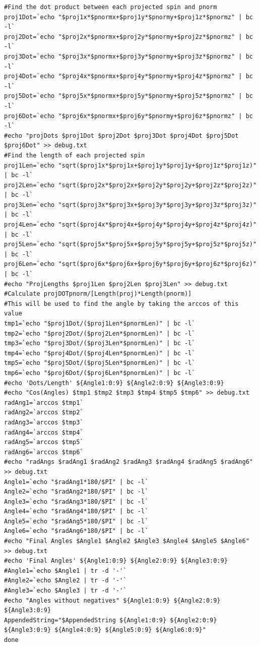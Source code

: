 \documentclass{article}
\begin{document}
\begin{lstlisting}
#Find the dot product between each projected spin and pnorm
proj1Dot=`echo "$proj1x*$pnormx+$proj1y*$pnormy+$proj1z*$pnormz" | bc -l`
proj2Dot=`echo "$proj2x*$pnormx+$proj2y*$pnormy+$proj2z*$pnormz" | bc -l`
proj3Dot=`echo "$proj3x*$pnormx+$proj3y*$pnormy+$proj3z*$pnormz" | bc -l`
proj4Dot=`echo "$proj4x*$pnormx+$proj4y*$pnormy+$proj4z*$pnormz" | bc -l`
proj5Dot=`echo "$proj5x*$pnormx+$proj5y*$pnormy+$proj5z*$pnormz" | bc -l`
proj6Dot=`echo "$proj6x*$pnormx+$proj6y*$pnormy+$proj6z*$pnormz" | bc -l`
#echo "projDots $proj1Dot $proj2Dot $proj3Dot $proj4Dot $proj5Dot $proj6Dot" >> debug.txt
#Find the length of each projected spin
proj1Len=`echo "sqrt($proj1x*$proj1x+$proj1y*$proj1y+$proj1z*$proj1z)" | bc -l`
proj2Len=`echo "sqrt($proj2x*$proj2x+$proj2y*$proj2y+$proj2z*$proj2z)" | bc -l`
proj3Len=`echo "sqrt($proj3x*$proj3x+$proj3y*$proj3y+$proj3z*$proj3z)" | bc -l`
proj4Len=`echo "sqrt($proj4x*$proj4x+$proj4y*$proj4y+$proj4z*$proj4z)" | bc -l`
proj5Len=`echo "sqrt($proj5x*$proj5x+$proj5y*$proj5y+$proj5z*$proj5z)" | bc -l`
proj6Len=`echo "sqrt($proj6x*$proj6x+$proj6y*$proj6y+$proj6z*$proj6z)" | bc -l`
#echo "ProjLengths $proj1Len $proj2Len $proj3Len" >> debug.txt
#Calculate projDOTpnorm/[Length(proj)*Length(pnorm)]
#This will be used to find the angle by taking the arccos of this value
tmp1=`echo "$proj1Dot/($proj1Len*$pnormLen)" | bc -l`
tmp2=`echo "$proj2Dot/($proj2Len*$pnormLen)" | bc -l`
tmp3=`echo "$proj3Dot/($proj3Len*$pnormLen)" | bc -l`
tmp4=`echo "$proj4Dot/($proj4Len*$pnormLen)" | bc -l`
tmp5=`echo "$proj5Dot/($proj5Len*$pnormLen)" | bc -l`
tmp6=`echo "$proj6Dot/($proj6Len*$pnormLen)" | bc -l`
#echo 'Dots/Length' ${Angle1:0:9} ${Angle2:0:9} ${Angle3:0:9}
#echo "Cos(Angles) $tmp1 $tmp2 $tmp3 $tmp4 $tmp5 $tmp6" >> debug.txt
radAng1=`arccos $tmp1`
radAng2=`arccos $tmp2`
radAng3=`arccos $tmp3`
radAng4=`arccos $tmp4`
radAng5=`arccos $tmp5`
radAng6=`arccos $tmp6`
#echo "radAngs $radAng1 $radAng2 $radAng3 $radAng4 $radAng5 $radAng6" >> debug.txt
Angle1=`echo "$radAng1*180/$PI" | bc -l`
Angle2=`echo "$radAng2*180/$PI" | bc -l`
Angle3=`echo "$radAng3*180/$PI" | bc -l`
Angle4=`echo "$radAng4*180/$PI" | bc -l`
Angle5=`echo "$radAng5*180/$PI" | bc -l`
Angle6=`echo "$radAng6*180/$PI" | bc -l`
#echo "Final Angles $Angle1 $Angle2 $Angle3 $Angle4 $Angle5 $Angle6" >> debug.txt
#echo 'Final Angles' ${Angle1:0:9} ${Angle2:0:9} ${Angle3:0:9}
#Angle1=`echo $Angle1 | tr -d '-'`
#Angle2=`echo $Angle2 | tr -d '-'`
#Angle3=`echo $Angle3 | tr -d '-'`
#echo "Angles without negatives" ${Angle1:0:9} ${Angle2:0:9} ${Angle3:0:9}
AppendedString="$AppendedString ${Angle1:0:9} ${Angle2:0:9} ${Angle3:0:9} ${Angle4:0:9} ${Angle5:0:9} ${Angle6:0:9}"
done


\end{lstlisting}
\end{document}
